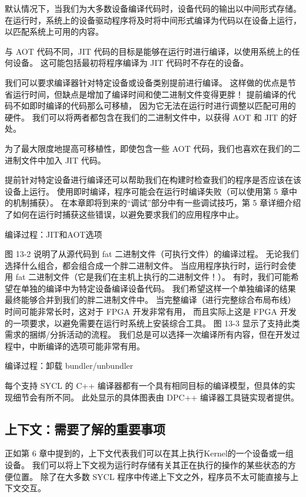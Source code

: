 默认情况下，当我们为大多数设备编译代码时，设备代码的输出以中间形式存储。 
在运行时，系统上的设备驱动程序将及时将中间形式编译为代码以在设备上运行，以匹配系统上可用的内容。

\begin{remark}
	与 AOT 代码不同，JIT 代码的目标是能够在运行时进行编译，以使用系统上的任何设备。
	这可能包括最初将程序编译为 JIT 代码时不存在的设备。
\end{remark}

我们可以要求编译器针对特定设备或设备类别提前进行编译。 
这样做的优点是节省运行时间，但缺点是增加了编译时间和使二进制文件变得更胖！ 提前编译的代码不如即时编译的代码那么可移植，
因为它无法在运行时进行调整以匹配可用的硬件。 我们可以将两者都包含在我们的二进制文件中，以获得 AOT 和 JIT 的好处。

\begin{remark}
	为了最大限度地提高可移植性，即使包含一些 AOT 代码，我们也喜欢在我们的二进制文件中加入 JIT 代码。
\end{remark}

提前针对特定设备进行编译还可以帮助我们在构建时检查我们的程序是否应该在该设备上运行。 
使用即时编译，程序可能会在运行时编译失败（可以使用第 5 章中的机制捕获）。 
在本章即将到来的“调试”部分中有一些调试技巧，第 5 章详细介绍了如何在运行时捕获这些错误，以避免要求我们的应用程序中止。

{\color{red} 编译过程：JIT和AOT选项}

图 13-2 说明了从源代码到 fat 二进制文件（可执行文件）的编译过程。 
无论我们选择什么组合，都会组合成一个胖二进制文件。 
当应用程序执行时，运行时会使用 fat 二进制文件（它是我们在主机上执行的二进制文件！）。 
有时，我们可能希望在单独的编译中为特定设备编译设备代码。 
我们希望这样一个单独编译的结果最终能够合并到我们的胖二进制文件中。 
当完整编译（进行完整综合布局布线）时间可能非常长时，这对于 FPGA 开发非常有用，
而且实际上这是 FPGA 开发的一项要求，以避免需要在运行时系统上安装综合工具。 
图 13-3 显示了支持此类需求的捆绑/分拆活动的流程。 
我们总是可以选择一次编译所有内容，但在开发过程中，中断编译的选项可能非常有用。

{\color{red} 编译过程：卸载 bundler/unbundler}

每个支持 SYCL 的 C++ 编译器都有一个具有相同目标的编译模型，但具体的实现细节会有所不同。 
此处显示的具体图表由 DPC++ 编译器工具链实现者提供。

\subsection{上下文：需要了解的重要事项}
正如第 6 章中提到的，上下文代表我们可以在其上执行Kernel的一个设备或一组设备。 
我们可以将上下文视为运行时存储有关其正在执行的操作的某些状态的方便位置。 
除了在大多数 SYCL 程序中传递上下文之外，程序员不太可能直接与上下文交互。

